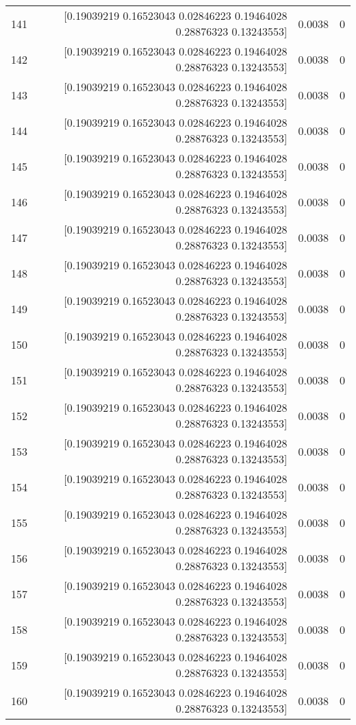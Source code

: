 \begin{longtable}{lrrr}
141 & [0.19039219 0.16523043 0.02846223 0.19464028 0.28876323 0.13243553] & 0.0038 & 0 \\
142 & [0.19039219 0.16523043 0.02846223 0.19464028 0.28876323 0.13243553] & 0.0038 & 0 \\
143 & [0.19039219 0.16523043 0.02846223 0.19464028 0.28876323 0.13243553] & 0.0038 & 0 \\
144 & [0.19039219 0.16523043 0.02846223 0.19464028 0.28876323 0.13243553] & 0.0038 & 0 \\
145 & [0.19039219 0.16523043 0.02846223 0.19464028 0.28876323 0.13243553] & 0.0038 & 0 \\
146 & [0.19039219 0.16523043 0.02846223 0.19464028 0.28876323 0.13243553] & 0.0038 & 0 \\
147 & [0.19039219 0.16523043 0.02846223 0.19464028 0.28876323 0.13243553] & 0.0038 & 0 \\
148 & [0.19039219 0.16523043 0.02846223 0.19464028 0.28876323 0.13243553] & 0.0038 & 0 \\
149 & [0.19039219 0.16523043 0.02846223 0.19464028 0.28876323 0.13243553] & 0.0038 & 0 \\
150 & [0.19039219 0.16523043 0.02846223 0.19464028 0.28876323 0.13243553] & 0.0038 & 0 \\
151 & [0.19039219 0.16523043 0.02846223 0.19464028 0.28876323 0.13243553] & 0.0038 & 0 \\
152 & [0.19039219 0.16523043 0.02846223 0.19464028 0.28876323 0.13243553] & 0.0038 & 0 \\
153 & [0.19039219 0.16523043 0.02846223 0.19464028 0.28876323 0.13243553] & 0.0038 & 0 \\
154 & [0.19039219 0.16523043 0.02846223 0.19464028 0.28876323 0.13243553] & 0.0038 & 0 \\
155 & [0.19039219 0.16523043 0.02846223 0.19464028 0.28876323 0.13243553] & 0.0038 & 0 \\
156 & [0.19039219 0.16523043 0.02846223 0.19464028 0.28876323 0.13243553] & 0.0038 & 0 \\
157 & [0.19039219 0.16523043 0.02846223 0.19464028 0.28876323 0.13243553] & 0.0038 & 0 \\
158 & [0.19039219 0.16523043 0.02846223 0.19464028 0.28876323 0.13243553] & 0.0038 & 0 \\
159 & [0.19039219 0.16523043 0.02846223 0.19464028 0.28876323 0.13243553] & 0.0038 & 0 \\
160 & [0.19039219 0.16523043 0.02846223 0.19464028 0.28876323 0.13243553] & 0.0038 & 0 \\

\end{longtable}
